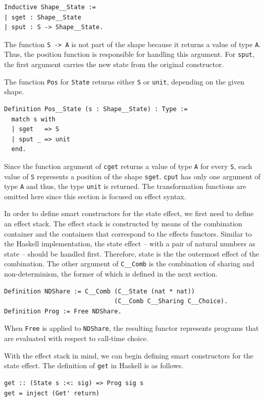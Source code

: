 \documentclass[a4paper, 11pt, fleqn, twoside, abstract=on]{scrreprt}
\newcommand{\hinl}[1]{\texttt{#1}}
\newcommand{\cinl}[1]{\texttt{#1}}
\begin{document}
\begin{verbatim}
Inductive Shape__State :=
| sget : Shape__State
| sput : S -> Shape__State.
\end{verbatim}
\noindent
The function \cinl{S -> A} is not part of the shape because it returns a value of type \cinl{A}.
Thus, the position function is responsible for handling this argument.
For \cinl{sput}, the first argument carries the new state from the original constructor.

The function \cinl{Pos} for \cinl{State} returns either \cinl{S} or \cinl{unit}, depending on the given shape.

\begin{verbatim}
Definition Pos__State (s : Shape__State) : Type :=
  match s with
  | sget   => S
  | sput _ => unit
  end.
\end{verbatim}
\noindent
Since the function argument of \cinl{cget} returns a value of type \cinl{A} for every \cinl{S}, each value of \cinl{S} represents a position of the shape \cinl{sget}.
\cinl{cput} has only one argument of type \cinl{A} and thus, the type \cinl{unit} is returned.
The transformation functions are omitted here since this section is focused on effect syntax.

In order to define smart constructors for the state effect, we first need to define an effect stack.
The effect stack is constructed by means of the combination container and the containers that correspond to the effects functors.
Similar to the Haskell implementation, the state effect -- with a pair of natural numbers as state -- should be handled first.
Therefore, state is the the outermost effect of the combination.
The other argument of \cinl{C__Comb} is the combination of sharing and non-determinism, the former of which is defined in the next section.
 
\begin{verbatim}
Definition NDShare := C__Comb (C__State (nat * nat)) 
                              (C__Comb C__Sharing C__Choice).
Definition Prog := Free NDShare.
\end{verbatim}
\noindent
When \cinl{Free} is applied to \cinl{NDShare}, the resulting functor represents programs that are evaluated with respect to call-time choice.

With the effect stack in mind, we can begin defining smart constructors for the state effect.
The definition of \hinl{get} in Haskell is as follows.

\begin{verbatim}
get :: (State s :<: sig) => Prog sig s
get = inject (Get' return)
\end{verbatim}
\end{document}
